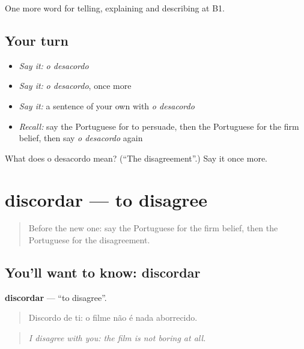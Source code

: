 \begin{grammarlens}[title={What you've built}]
One more word for telling, explaining and describing at B1.
\end{grammarlens}

\subsection*{Your turn}
\begin{itemize}
\raggedright
  \item \emph{Say it:} \emph{o desacordo}
  \item \emph{Say it:} \emph{o desacordo}, once more
  \item \emph{Say it:} a sentence of your own with \emph{o desacordo}
  \item \emph{Recall:} say the Portuguese for to persuade, then the Portuguese for the firm belief, then say \emph{o desacordo} again
\end{itemize}

\begin{tcolorbox}[breakable,colback=teal!4,colframe=teal!35!black,title={Before you move on}]
What does o desacordo mean? (\textquotedblleft{}The disagreement\textquotedblright{}.) Say it once more.
\end{tcolorbox}
\section[discordar]{discordar — to disagree}

\label{lesson:PT-C338-discordar}



\begin{quote}
Before the new one: say the Portuguese for the firm belief, then the Portuguese for the disagreement.
\end{quote}

\subsection*{You'll want to know: discordar}
\textbf{discordar} — \textquotedblleft{}to disagree\textquotedblright{}.

\begin{quote}
Discordo de ti: o filme não é nada aborrecido.
\end{quote}

\begin{quote}
\emph{I disagree with you: the film is not boring at all.}
\end{quote}

